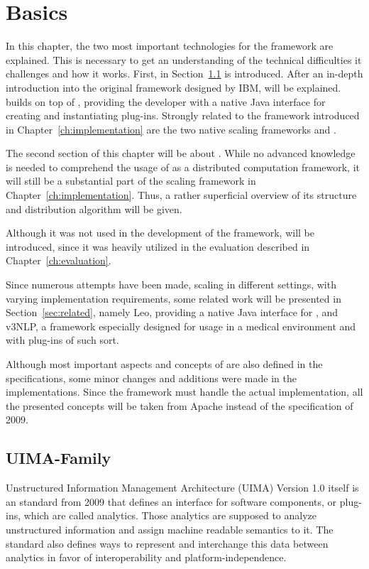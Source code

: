 
\chapter{Basics}
\label{ch:basics}
In this chapter, the two most important technologies for the framework are explained. This is necessary to get an understanding of the technical difficulties it challenges and how it works. First, in Section~\ref{sec:uima} \uima{} is introduced. After an in-depth introduction into the original framework designed by IBM, \uimafit{} will be explained. \uimafit{} builds on top of \uima{}, providing the developer with a native Java interface for creating and instantiating plug-ins. Strongly related to the framework introduced in Chapter~\ref{ch:implementation} are the two native scaling frameworks \uimacpe{} and \uimaas{}. 


The second section of this chapter will be about \spark{}. While no advanced knowledge is needed to comprehend the usage of \spark{} as a distributed computation framework, it will still be a substantial part of the \uima{} scaling framework in Chapter~\ref{ch:implementation}. Thus, a rather superficial overview of its structure and distribution algorithm will be given.

Although it was not used in the development of the framework, \docker{} will be introduced, since it was heavily utilized in the evaluation described in Chapter~\ref{ch:evaluation}.

Since numerous attempts have been made, scaling \uima{} in different settings, with varying implementation requirements, some related work will be presented in Section~\ref{sec:related}, namely Leo, providing a native Java interface for \uimaas{}, and v3NLP, a framework especially designed for usage in a medical environment and with plug-ins of such sort.

Although most important aspects and concepts of \uima{} are also defined in the specifications, some minor changes and additions were made in the implementations. Since the framework must handle the actual implementation, all the presented concepts will be taken from Apache \uima{} instead of the \uima{} specification of 2009.



\section{UIMA-Family}
\label{sec:uima}
Unstructured Information Management Architecture (UIMA) Version 1.0 itself is an \oasis{} standard from 2009 that defines an interface for software components, or plug-ins, which are called analytics. Those analytics are supposed to analyze unstructured information and assign machine readable semantics to it. The standard also defines ways to represent and interchange this data between analytics in favor of interoperability and platform-independence. 


